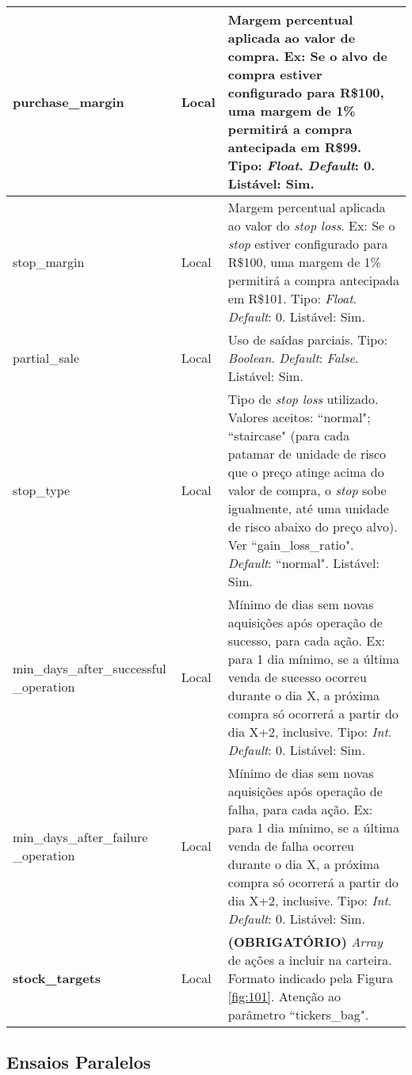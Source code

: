 \begin{center}
{\begin{longtable}[m]{| m{11em} | m{3em}| m{21em} |}
        purchase\_margin & Local & Margem percentual aplicada ao valor de compra. Ex: Se o alvo de compra estiver configurado para R\$100, uma margem de 1\% permitirá a compra antecipada em R\$99. Tipo: \textit{Float}. \textit{Default}: 0. Listável: Sim. \\
        \hline
        stop\_margin & Local & Margem percentual aplicada ao valor do \textit{stop loss}. Ex: Se o \textit{stop} estiver configurado para R\$100, uma margem de 1\% permitirá a compra antecipada em R\$101. Tipo: \textit{Float}. \textit{Default}: 0. Listável: Sim. \\
        \hline
        partial\_sale & Local & Uso de saídas parciais. Tipo: \textit{Boolean}. \textit{Default}: \textit{False}. Listável: Sim. \\
        \hline
        stop\_type & Local & Tipo de \textit{stop loss} utilizado. Valores aceitos: ``normal"; ``staircase" (para cada patamar de unidade de risco que o preço atinge acima do valor de compra, o \textit{stop} sobe igualmente, até uma unidade de risco abaixo do preço alvo). Ver ``gain\_loss\_ratio". \textit{Default}: ``normal". Listável: Sim. \\
        \hline
        min\_days\_after\_successful \_operation & Local & Mínimo de dias sem novas aquisições após operação de sucesso, para cada ação. Ex: para 1 dia mínimo, se a última venda de sucesso ocorreu durante o dia X, a próxima compra só ocorrerá a partir do dia X+2, inclusive. Tipo: \textit{Int}. \textit{Default}: 0. Listável: Sim. \\
        \hline
        min\_days\_after\_failure \_operation & Local & Mínimo de dias sem novas aquisições após operação de falha, para cada ação. Ex: para 1 dia mínimo, se a última venda de falha ocorreu durante o dia X, a próxima compra só ocorrerá a partir do dia X+2, inclusive. Tipo: \textit{Int}. \textit{Default}: 0. Listável: Sim. \\
        \hline

        \textbf{stock\_targets} & Local & \textbf{(OBRIGATÓRIO)} \textit{Array} de ações a incluir na carteira. Formato indicado pela Figura \ref{fig:101}. Atenção ao parâmetro ``tickers\_bag". \\
        \hline

    \end{longtable}}
\end{center}



\subsection{Ensaios Paralelos}

